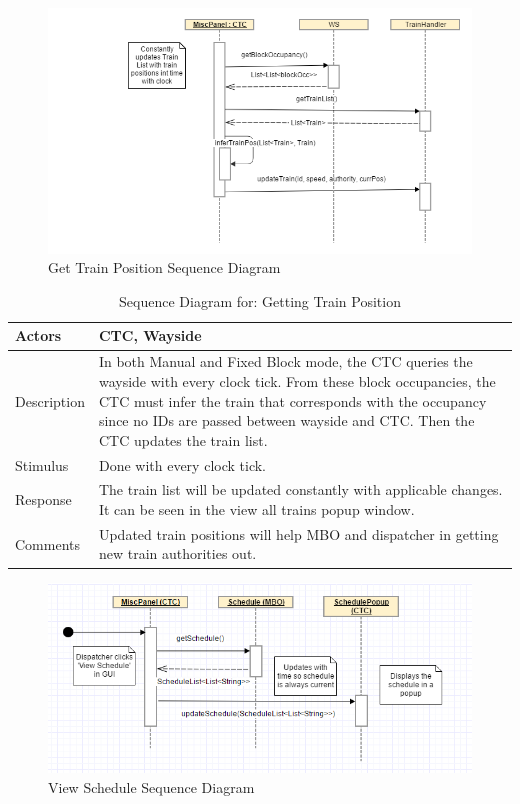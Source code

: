 \documentclass[]{article}
\begin{document}
\begin{figure}[H]
	\centering
	\includegraphics[width=\textwidth]{CTCgetTrainPosition.png}
	\caption{Get Train Position Sequence Diagram}
\end{figure}

\begin{table}[H]
	\centering
	\caption{Sequence Diagram for: Getting Train Position}
	\begin{tabular}{|l|l|}
		\hline
		Actors & \parbox[t]{10cm}{CTC, Wayside} \\ \hline
		Description & \parbox[t]{10cm}{In both Manual and Fixed Block mode, the CTC queries the wayside with every clock tick. From these block occupancies, the CTC must infer the train that corresponds with the occupancy since no IDs are passed between wayside and CTC. Then the CTC updates the train list.} \\ \hline
		Stimulus &  \parbox[t]{10cm}{Done with every clock tick.} \\ \hline
		Response & \parbox[t]{10cm}{The train list will be updated constantly with applicable changes. It can be seen in the view all trains popup window.}\\ \hline
		Comments & \parbox[t]{10cm}{Updated train positions will help MBO and dispatcher in getting new train authorities out.}  \\ \hline
	\end{tabular}
\end{table}

\begin{figure}[H]
	\centering
	\includegraphics[width=\textwidth]{CTCloadSchedule.png}
	\caption{View Schedule Sequence Diagram}
\end{figure}
\end{document}
